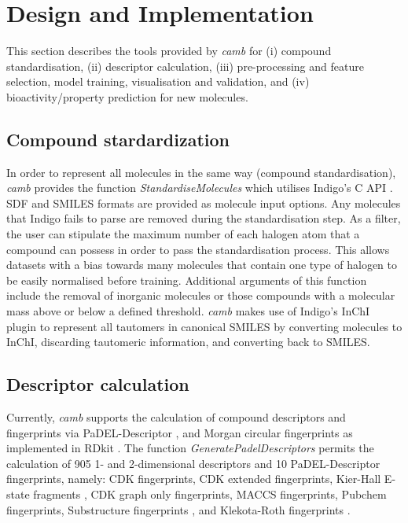 \documentclass[twoside,a4wide,10pt]{article}
\begin{document}
\section*{Design and Implementation}

This section describes the tools provided by {\it camb} 
for (i) compound standardisation, (ii) 
descriptor calculation, 
(iii) pre-processing and feature selection, model training, visualisation and validation, and (iv) bioactivity/property prediction for new molecules.

\subsection{Compound stardardization}
In order to represent all molecules in the same 
way (compound standardisation),
{\it camb}  provides the function {\it StandardiseMolecules} which utilises Indigo's C API \citep{Indigo}.
SDF and SMILES formats are provided as molecule input options. Any molecules that Indigo fails to parse are removed during the standardisation step.
As a filter, the user can stipulate the maximum number of each halogen atom that a compound can possess in order to pass the standardisation process. This allows datasets with a bias towards many molecules that contain one type of halogen to be easily normalised before training.
Additional arguments of this function include the removal of inorganic molecules
or those compounds with a molecular mass above or below a defined threshold.
{\it camb} makes use of Indigo's InChI \citep{inchi} plugin to represent all tautomers in canonical SMILES
by converting molecules to InChI, discarding tautomeric information, and converting back to SMILES.  

\subsection{Descriptor calculation} 

Currently, {\it camb} supports the calculation of compound descriptors and fingerprints via PaDEL-Descriptor \citep{padel},
and Morgan circular fingerprints \citep{extended_fp} as implemented in RDkit \citep{rdkit}.
The function {\it GeneratePadelDescriptors} permits the calculation of 905 1- and 2-dimensional descriptors and 10 PaDEL-Descriptor fingerprints, namely: 
CDK fingerprints, CDK extended fingerprints, Kier-Hall E-state fragments \cite{state_fp}, CDK graph only fingerprints, MACCS fingerprints,
Pubchem fingerprints, Substructure fingerprints \citep{obabel}, and Klekota-Roth fingerprints \citep{privileged_substructures}.
\end{document}
